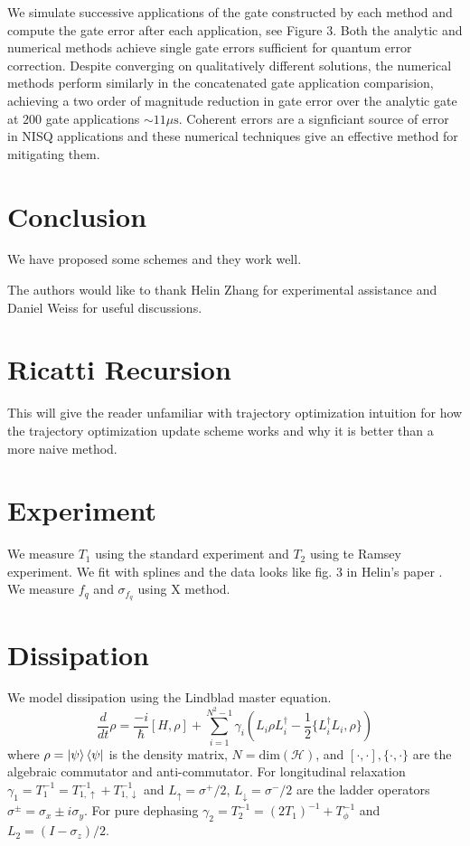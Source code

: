 \documentclass[
  amsfonts,
  amsmath,
  tbtags,
  amssymb,
  aps,
  nobibnotes,
  twocolumn,
  superscriptaddress,
]{revtex4-2}
\begin{document}
We simulate successive applications of the gate constructed by each method and compute the gate error
after each application, see Figure 3. Both the analytic and numerical methods achieve single gate errors
sufficient for quantum error correction. Despite converging on qualitatively different solutions, the
numerical methods perform similarly in the concatenated gate application comparision, achieving a two
order of magnitude reduction in gate error over the analytic gate at $200$
gate applications $\sim 11 \mu\textrm{s}$.
Coherent errors are a signficiant source of error in NISQ applications and these numerical techniques give
an effective method for mitigating them.

\section{Conclusion}
We have proposed some schemes and they work well.


\begin{acknowledgments}
  The authors would like to thank Helin Zhang for experimental assistance
  and Daniel Weiss for useful discussions.
\end{acknowledgments}


\appendix
\section{Ricatti Recursion}
This will give the reader unfamiliar with trajectory
optimization intuition for how the trajectory optimization
update scheme works and why it is better than
a more naive method.


\section{Experiment}
We measure $T_{1}$ using the standard experiment
and $T_{2}$ using te Ramsey experiment. We fit with splines
and the data looks like fig. 3 in Helin's paper \cite{zhang2020universal}.
We measure $f_{q}$ and $\sigma_{f_{q}}$ using X method.


\section{Dissipation}
We model dissipation using the Lindblad master
equation. 
\begin{equation}
  \frac{d}{dt} \rho = \frac{-i}{\hbar} [H, \rho] + \sum_{i = 1}^{N^{2} - 1} \gamma_{i} (L_{i} \rho L_{i}^{\dagger} - \frac{1}{2} \{L_{i}^{\dagger} L_{i}, \rho\})
\end{equation}
where $\rho = \ket{\psi}\bra{\psi}$ is the density matrix, $N = \textrm{dim}(\mathcal{H})$,
and $[\cdot, \cdot], \{\cdot, \cdot \}$ are the algebraic commutator and anti-commutator.
For longitudinal relaxation $\gamma_{1} = T_{1}^{-1} = T_{1, \uparrow}^{-1} + T_{1, \downarrow}^{-1}$
and $L_{\uparrow} = \sigma^{+}/2$,
$L_{\downarrow} = \sigma^{-}/2$
are the ladder operators $\sigma^{\pm} = \sigma_{x} \pm i \sigma_{y}$. For pure dephasing
$\gamma_{2} = T_{2}^{-1} = (2 T_{1})^{-1} + T_{\phi}^{-1}$ and
$L_{2} = (I - \sigma_{z})/2$.
\end{document}
